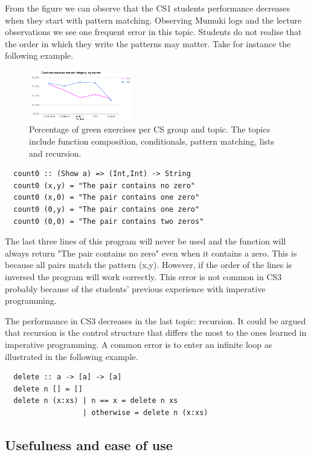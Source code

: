 From the figure we can observe that the CS1 students performance decreases when they start with pattern matching. Observing Mumuki logs and the lecture observations we see one frequent error in this topic. Students do not realise that the order in which they write the patterns may matter. Take for instance the following example. 

\begin{figure}
    \centering
    \includegraphics[width=0.4\textwidth]{graphics/success-rate-per-category-by-course.png}
    \caption{Percentage of green exercises per CS group and topic. The topics include function composition, conditionals, pattern matching, lists and recursion.}
    \label{fig:success-rate-by-course}
\end{figure}

\begin{verbatim}
  count0 :: (Show a) => (Int,Int) -> String
  count0 (x,y) = "The pair contains no zero"
  count0 (x,0) = "The pair contains one zero"
  count0 (0,y) = "The pair contains one zero"
  count0 (0,0) = "The pair contains two zeros"
\end{verbatim}

The last three lines of this program will never be used and the function will always return "The pair contains no zero" even when it contains a zero. This is because all pairs match the pattern (x,y). However, if the order of the lines is inversed the program will work correctly. This error is not common in CS3 probably because of the students' previous experience with imperative programming.

The performance in CS3 decreases in the last topic: recursion. It could be argued that recursion is the control structure that differs the most to the ones learned in imperative programming. A common error is to enter an infinite loop as illustrated in the following example.  

\begin{verbatim}
  delete :: a -> [a] -> [a]
  delete n [] = []
  delete n (x:xs) | n == x = delete n xs
                  | otherwise = delete n (x:xs)
\end{verbatim}


\subsection{Usefulness and ease of use}

